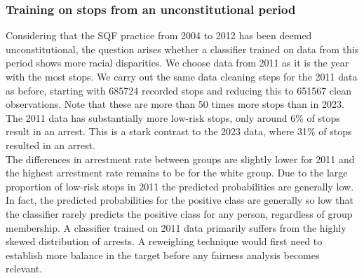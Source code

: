 \subsubsection*{Training on stops from an unconstitutional period}
Considering that the SQF practice from 2004 to 2012 has been deemed unconstitutional, the question arises whether a classifier trained on data from this period shows more racial disparities.
We choose data from 2011 as it is the year with the most stops.
We carry out the same data cleaning steps for the 2011 data as before, starting with 685724 recorded stops and reducing this to 651567 clean observations. Note that these are more than 50 times more stops than in 2023.
The 2011 data has substantially more low-risk stops, only around 6\% of stops result in an arrest. This is a stark contrast to the 2023 data, where 31\% of stops resulted in an arrest.\\
The differences in arrestment rate between groups are slightly lower for 2011 and the highest arrestment rate remains to be for the white group.
Due to the large proportion of low-risk stops in 2011 the predicted probabilities are generally low. In fact, the predicted probabilities for the positive class are generally so low that the classifier rarely predicts the positive class for any person, regardless of group membership.
A classifier trained on 2011 data primarily suffers from the highly skewed distribution of arrests. A reweighing technique would first need to establish more balance in the target before any fairness analysis becomes relevant.

